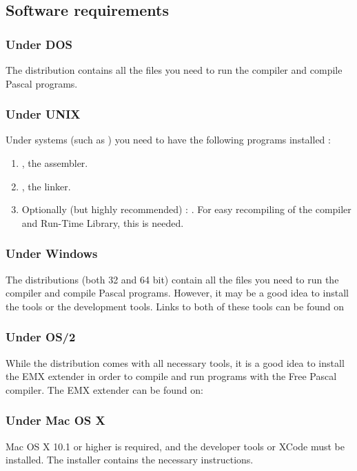\subsection{Software requirements}

\subsubsection{Under DOS}
The \dos distribution contains all the files you need to run the compiler
and compile Pascal programs.

\subsubsection{Under UNIX}
Under \unix systems (such as \linux) you need to have the following programs
installed :
\begin{enumerate}
\item \gnu {}, the \gnu assembler.
\item \gnu {}, the \gnu linker.
\item Optionally (but highly recommended) : \gnu {}. For easy
recompiling of the compiler and Run-Time Library, this is needed.
\end{enumerate}

\subsubsection{Under Windows}
The \windows distributions (both 32 and 64 bit) contain all the files you need to run the compiler
and compile Pascal programs. However, it may be a good idea to install
the  tools or the  development tools. Links
to both of these tools can be found on 

\subsubsection{Under OS/2}
While the \fpc distribution comes with all necessary tools, it is a good
idea to install the EMX extender in order to compile and run
programs with the Free Pascal compiler. The EMX extender can be found on:\\

\subsubsection{Under Mac OS X}
Mac OS X 10.1 or higher is required, and the developer tools or XCode
must be installed. The installer contains the necessary instructions.

